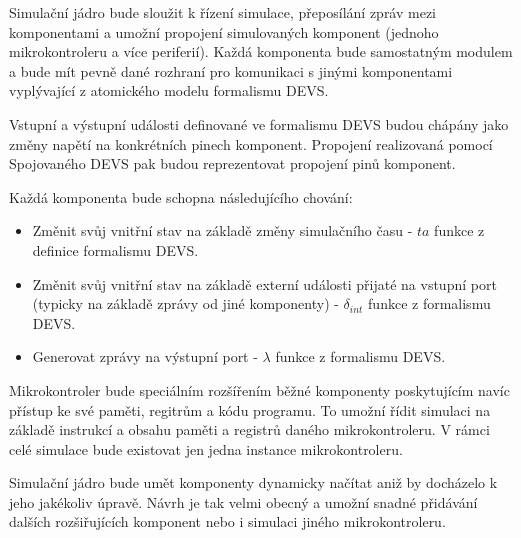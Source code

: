 Simulační jádro bude sloužit k řízení simulace, přeposílání zpráv mezi komponentami a umožní propojení simulovaných komponent (jednoho mikrokontroleru a více periferií). Každá komponenta bude samostatným modulem a bude mít pevně dané rozhraní pro komunikaci s jinými komponentami vyplývající z atomického modelu formalismu DEVS.

Vstupní a výstupní události definované ve formalismu DEVS budou chápány jako změny napětí na konkrétních pinech komponent. Propojení realizovaná pomocí Spojovaného DEVS pak budou reprezentovat propojení pinů komponent.

Každá komponenta bude schopna následujícího chování:

\begin{itemize}
\item Změnit svůj vnitřní stav na základě změny simulačního času - $ta$ funkce z definice formalismu DEVS.
\item Změnit svůj vnitřní stav na základě externí události přijaté na vstupní port (typicky na základě zprávy od jiné komponenty) - $\delta_{int}$ funkce z formalismu DEVS.
\item Generovat zprávy na výstupní port - $\lambda$ funkce z formalismu DEVS.
\end{itemize}

Mikrokontroler bude speciálním rozšířením běžné komponenty poskytujícím navíc přístup ke své paměti, regitrům a kódu programu. To umožní řídit simulaci na základě instrukcí a obsahu paměti a registrů daného mikrokontroleru. V rámci celé simulace bude existovat jen jedna instance mikrokontroleru.

Simulační jádro bude umět komponenty dynamicky načítat aniž by docházelo k jeho jakékoliv úpravě. Návrh je tak velmi obecný a umožní snadné přidávání dalších rozšiřujících komponent nebo i simulaci jiného mikrokontroleru.

